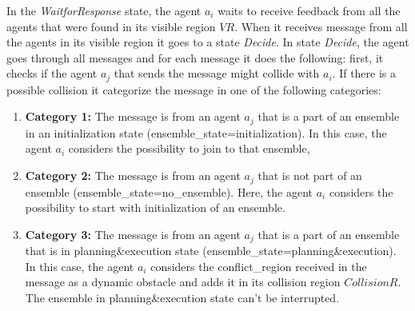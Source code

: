 \documentclass[journal]{IEEEtran}
\theoremstyle{definition}
\newcommand{\ugh}[1]{\textcolor{red}{\uwave{#1}}} %
\newcommand\patrizio[1]{\nb{Patrizio}{#1}}
\begin{document}
In the \textit{WaitforResponse} state, the agent $a_i$ waits to receive feedback from all the agents that were found in its visible region $VR$. When it receives message from all the agents in its visible region it goes to a state \textit{Decide}. In state \textit{Decide}, the agent goes through all messages and for each message it does the following: first, it checks if the agent $a_j$ that sends the message might collide with $a_i$.
If there is a possible collision it categorize the message in one of the following categories:
\begin{enumerate}
\item  \textbf{Category 1:} The message is from an agent $a_j$ that is a part of an ensemble in an initialization state (ensemble\_state=initialization). In this case, the agent $a_i$ considers the possibility to join to that ensemble, 
\item \textbf{Category 2:} The message is from an agent $a_j$ that is not part of an ensemble (ensemble\_state=no\_ensemble). Here, the agent $a_i$ considers the possibility to start with initialization of an ensemble.
\item \textbf{Category 3:} The message is from an agent $a_j$ that is a part of an ensemble that is in planning\&execution state (ensemble\_state=planning\&execution). In this case, the agent $a_i$ considers the conflict\_region received in the message as a dynamic obstacle and adds it in its collision region $CollisionR$. The ensemble in planning\&execution state can't be interrupted.
\end{enumerate}
\end{document}
